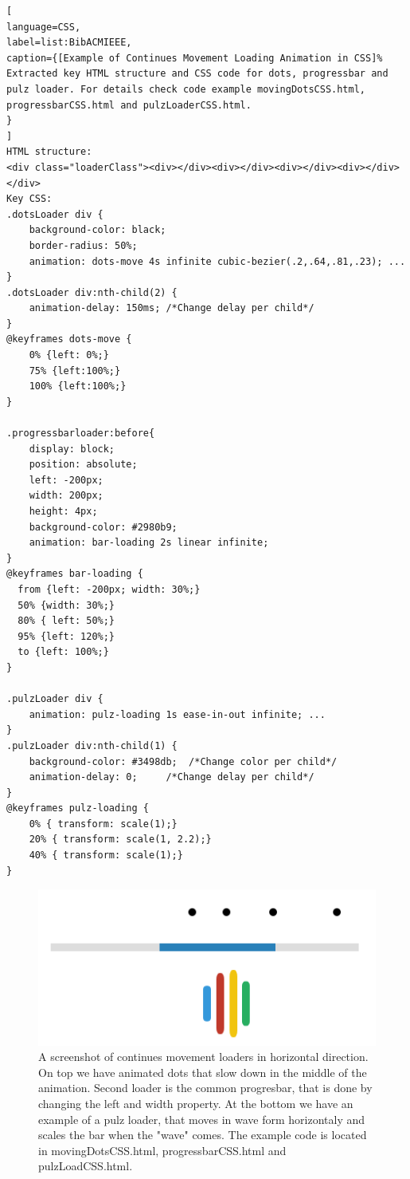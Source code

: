 \begin{lstlisting}[
language=CSS,
label=list:BibACMIEEE,
caption={[Example of Continues Movement Loading Animation in CSS]%
Extracted key HTML structure and CSS code for dots, progressbar and pulz loader. For details check code example movingDotsCSS.html, progressbarCSS.html and pulzLoaderCSS.html.
}
]
HTML structure:
<div class="loaderClass"><div></div><div></div><div></div><div></div></div>
Key CSS:
.dotsLoader div {
	background-color: black;
	border-radius: 50%;
	animation: dots-move 4s infinite cubic-bezier(.2,.64,.81,.23); ...
}
.dotsLoader div:nth-child(2) {
	animation-delay: 150ms; /*Change delay per child*/
}
@keyframes dots-move {
	0% {left: 0%;}
	75% {left:100%;}
	100% {left:100%;}
}

.progressbarloader:before{
	display: block;
	position: absolute;
	left: -200px;
	width: 200px;
	height: 4px;
	background-color: #2980b9;
	animation: bar-loading 2s linear infinite;
}
@keyframes bar-loading {
  from {left: -200px; width: 30%;}
  50% {width: 30%;}
  80% { left: 50%;}
  95% {left: 120%;}
  to {left: 100%;}
}

.pulzLoader div {
	animation: pulz-loading 1s ease-in-out infinite; ...
}
.pulzLoader div:nth-child(1) {  
	background-color: #3498db;  /*Change color per child*/
	animation-delay: 0;     /*Change delay per child*/
}
@keyframes pulz-loading {
	0% { transform: scale(1);}
	20% { transform: scale(1, 2.2);}
	40% { transform: scale(1);}
}
\end{lstlisting}
\label{list:horizontalLoad}

\begin{figure}[h]
\centering
\includegraphics[keepaspectratio,width=\hsize,height=\halfh]
{images/horizontalLoad.png}

\caption[Continues Horizontal Movement Loading Examples]{
A screenshot of continues movement loaders in horizontal direction. On top we have animated dots that slow down in the middle of the animation. Second loader is the common progresbar, that is done by changing the left and width property. At the bottom we have an example of a pulz loader, that moves in wave form horizontaly and scales the bar when the "wave" comes. The example code is located in movingDotsCSS.html, progressbarCSS.html and pulzLoadCSS.html.
}
\label{fig:rotationLoad}
\end{figure}

